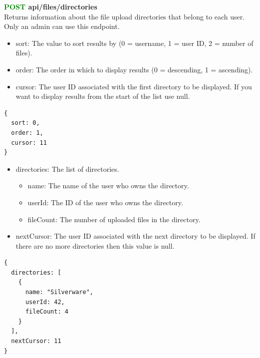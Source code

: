 \documentclass[onecolumn, draftclsnofoot,10pt, compsoc, usenames, dvipsnames]{IEEEtran}
\begin{document}
\noindent
\textbf{\textcolor{Green}{POST} api/files/directories} \\
Returns information about the file upload directories that belong to each user. Only an admin can use this endpoint.
\begin{itemize}
    \item sort: The value to sort results by (0 = username, 1 = user ID, 2 = number of files).
    \item order: The order in which to display results (0 = descending, 1 = ascending).
    \item cursor: The user ID associated with the first directory to be displayed. If you want to display results from the start of the list use null.
\end{itemize}
\begin{lstlisting}[caption=Example Request Body]
{
  sort: 0,
  order: 1,
  cursor: 11
}
\end{lstlisting}
\begin{itemize}
    \item directories: The list of directories.
    \begin{itemize}
        \item name: The name of the user who owns the directory.
        \item userId: The ID of the user who owns the directory.
        \item fileCount: The number of uploaded files in the directory.
    \end{itemize}
    \item nextCursor: The user ID associated with the next directory to be displayed. If there are no more directories then this value is null.
\end{itemize}
\begin{lstlisting}[caption=Example Response]
{
  directories: [
    {
      name: "Silverware",
      userId: 42,
      fileCount: 4
    }
  ],
  nextCursor: 11
}
\end{lstlisting}
\\~\\
\end{document}
